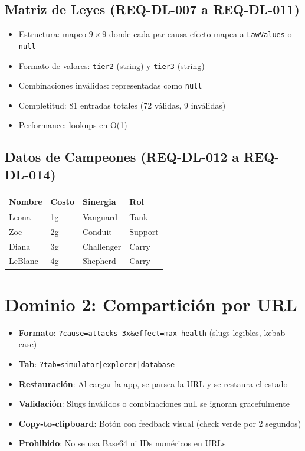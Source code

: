 \documentclass[11pt,a4paper]{report}
\begin{document}
\subsection{Matriz de Leyes (REQ-DL-007 a REQ-DL-011)}

\begin{itemize}
  \item Estructura: mapeo $9 \times 9$ donde cada par causa-efecto mapea a \texttt{LawValues} o \texttt{null}
  \item Formato de valores: \texttt{tier2} (string) y \texttt{tier3} (string)
  \item Combinaciones inválidas: representadas como \texttt{null}
  \item Completitud: 81 entradas totales (72 válidas, 9 inválidas)
  \item Performance: lookups en O(1)
\end{itemize}

\subsection{Datos de Campeones (REQ-DL-012 a REQ-DL-014)}

\begin{table}[h]
\centering
\begin{tabular}{@{}llll@{}}
\toprule
\textbf{Nombre} & \textbf{Costo} & \textbf{Sinergia} & \textbf{Rol} \\
\midrule
Leona & 1g & Vanguard & Tank \\
Zoe & 2g & Conduit & Support \\
Diana & 3g & Challenger & Carry \\
LeBlanc & 4g & Shepherd & Carry \\
\bottomrule
\end{tabular}
\end{table}

\section{Dominio 2: Compartición por URL}

\begin{itemize}
  \item \textbf{Formato}: \texttt{?cause=attacks-3x\&effect=max-health} (slugs legibles, kebab-case)
  \item \textbf{Tab}: \texttt{?tab=simulator|explorer|database}
  \item \textbf{Restauración}: Al cargar la app, se parsea la URL y se restaura el estado
  \item \textbf{Validación}: Slugs inválidos o combinaciones null se ignoran gracefulmente
  \item \textbf{Copy-to-clipboard}: Botón con feedback visual (check verde por 2 segundos)
  \item \textbf{Prohibido}: No se usa Base64 ni IDs numéricos en URLs
\end{itemize}
\end{document}
